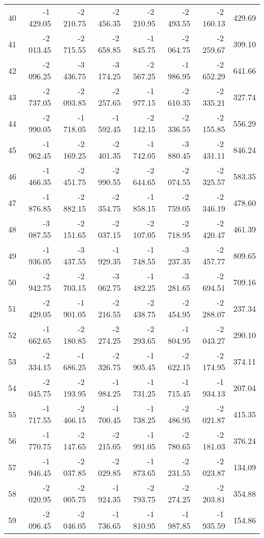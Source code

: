 \begin{longtable}{rrrrrrrr}
40 & -1\,429.05 & -2\,210.75 & -2\,456.35 & -2\,210.95 & -2\,493.55 & -2\,160.13 & 429.69  \\
41 & -2\,013.45 & -2\,715.55 & -2\,658.85 & -1\,845.75 & -2\,064.75 & -2\,259.67 & 399.10  \\
42 & -2\,096.25 & -3\,436.75 & -3\,174.25 & -2\,567.25 & -1\,986.95 & -2\,652.29 & 641.66  \\
43 & -2\,737.05 & -2\,093.85 & -2\,257.65 & -1\,977.15 & -2\,610.35 & -2\,335.21 & 327.74  \\
44 & -2\,990.05 & -1\,718.05 & -1\,592.45 & -2\,142.15 & -2\,336.55 & -2\,155.85 & 556.29  \\
45 & -1\,962.45 & -2\,169.25 & -2\,401.35 & -1\,742.05 & -3\,880.45 & -2\,431.11 & 846.24  \\
46 & -1\,466.35 & -2\,451.75 & -2\,990.55 & -2\,644.65 & -2\,074.55 & -2\,325.57 & 583.35  \\
47 & -1\,876.85 & -2\,882.15 & -2\,354.75 & -1\,858.15 & -2\,759.05 & -2\,346.19 & 478.60  \\
48 & -3\,087.55 & -2\,151.65 & -2\,037.15 & -2\,107.05 & -2\,718.95 & -2\,420.47 & 461.39  \\
49 & -1\,936.05 & -3\,437.55 & -1\,929.35 & -1\,748.55 & -3\,237.35 & -2\,457.77 & 809.65  \\
50 & -2\,942.75 & -2\,703.15 & -3\,062.75 & -1\,482.25 & -3\,281.65 & -2\,694.51 & 709.16  \\
51 & -2\,429.05 & -1\,901.05 & -2\,216.55 & -2\,438.75 & -2\,454.95 & -2\,288.07 & 237.34  \\
52 & -1\,662.65 & -2\,180.85 & -2\,274.25 & -2\,293.65 & -1\,804.95 & -2\,043.27 & 290.10  \\
53 & -2\,334.15 & -1\,686.25 & -2\,326.75 & -1\,905.45 & -2\,622.15 & -2\,174.95 & 374.11  \\
54 & -2\,045.75 & -2\,193.95 & -1\,984.25 & -1\,731.25 & -1\,715.45 & -1\,934.13 & 207.04  \\
55 & -1\,717.55 & -2\,466.15 & -1\,700.45 & -1\,738.25 & -2\,486.95 & -2\,021.87 & 415.35  \\
56 & -1\,770.75 & -2\,147.65 & -2\,215.05 & -1\,991.05 & -2\,780.65 & -2\,181.03 & 376.24  \\
57 & -1\,946.45 & -2\,037.85 & -2\,029.85 & -1\,873.65 & -2\,231.55 & -2\,023.87 & 134.09  \\
58 & -2\,020.95 & -2\,005.75 & -1\,924.35 & -2\,793.75 & -2\,274.25 & -2\,203.81 & 354.88  \\
59 & -2\,096.45 & -2\,046.05 & -1\,736.65 & -1\,810.95 & -1\,987.85 & -1\,935.59 & 154.86  \\

\end{longtable}
